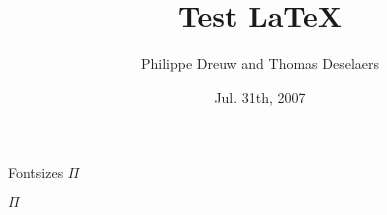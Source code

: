 \documentclass[final,hyperref={pdfpagelabels=false}]{beamer}
\title[Fancy Posters]{Test \LaTeX}
\author[Dreuw \& Deselaers]{Philippe Dreuw and Thomas Deselaers}
\institute[RWTH Aachen University]{Human Language Technology and Pattern Recognition,RWTH Aachen University}
\date{Jul. 31th, 2007}
\begin{document}
  \begin{frame}{} 
    \vfill
    \begin{block}{\large Fontsizes}
      \centering
      {\VERYHuge $\Pi$}

	$\Pi$
    \end{block}
    \vfill
  \end{frame}
  
\end{document}
